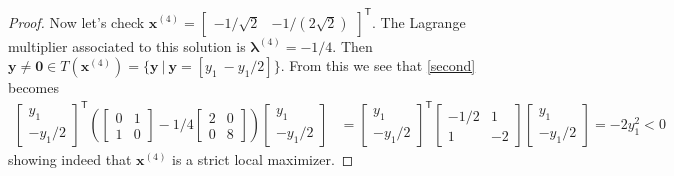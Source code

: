 \documentclass[12pt]{article}
\theoremstyle{definition}
\newcommand{\vc}[1]{\boldsymbol{#1}}
\newcommand{\tran}{\mathsf{T}}
\begin{document}
\begin{proof}
  Now let's check $\vc{x}^{(4)} = \begin{bmatrix}-1/\sqrt{2} & -1/(2\sqrt{2})\end{bmatrix}^\tran$.
  The Lagrange multiplier associated to this solution is $\vc{\lambda}^{(4)} = -1/4$. Then $\vc{y} \neq \vc{0} \in T(\vc{x}^{(4)}) = \{\vc{y}\ |\  \vc{y} = [y_1 \ -y_1/2]\}$. From this we see that \eqref{second} becomes
  \begin{align*}
    \begin{bmatrix}y_1 \\ -y_1/2\end{bmatrix}^\tran\left(\begin{bmatrix}0 & 1 \\ 1 & 0\end{bmatrix} - 1/4\begin{bmatrix}2 & 0 \\ 0 &8\end{bmatrix}\right)\begin{bmatrix}y_1 \\ -y_1/2\end{bmatrix} &=
    \begin{bmatrix}y_1 \\ -y_1/2\end{bmatrix}^\tran\begin{bmatrix}-1/2 & 1 \\ 1 & -2\end{bmatrix}\begin{bmatrix}y_1 \\ -y_1/2\end{bmatrix} = -2y_1^2 < 0
  \end{align*}
  showing indeed that $\vc{x}^{(4)}$ is a strict local maximizer.


\end{proof}
\end{document}
